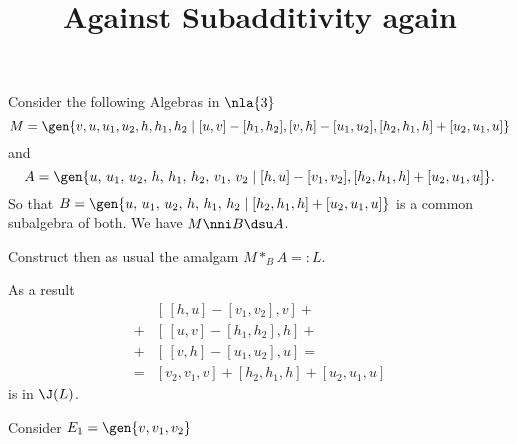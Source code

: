 \documentclass[a4paper,11pt,german,english]{article}
\title{Against Subadditivity again}
\begin{document}
\maketitle
Consider the following Algebras in $\nla{3}$
$$M=\gen{v,u,u_{1},u_{2},h,h_{1},h_{2}\mid[u,v]-[h_{1},h_{2}],[v,h]-[u_{1},u_{2}],[h_{2},h_{1},h]+[u_{2},u_{1},u]}$$
and
$$A=\gen{u,\,u_{1},\,u_{2},\,h,\,h_{1},\,h_{2},\,v_{1},\,v_{2}\mid[h,u]-[v_{1},v_{2}],[h_{2},h_{1},h]+[u_{2},u_{1},u]}.$$
So that $B=\gen{u,\,u_{1},\,u_{2},\,h,\,h_{1},\,h_{2}\mid[h_{2},h_{1},h]+[u_{2},u_{1},u]}$ is a common subalgebra of both. We have $M\nni B\dsu A$.


Construct
then as usual the amalgam $M \ast_{B} A=:L$.

\smallskip
As a result
\begin{align*}
&[\,[h,u]-[v_{1},v_{2}],v]+\\
+&[\,[u,v]-[h_{1},h_{2}],h]+\\
+&[\,[v,h]-[u_{1},u_{2}],u]=\\[+1mm]
=&[v_{2},v_{1},v]+[h_{2},h_{1},h]+[u_{2},u_{1},u]
\end{align*}
is in $\J(L)$.

\smallskip
Consider $E_{1}=\gen{v,v_{1},v_{2}}$
\end{document}
